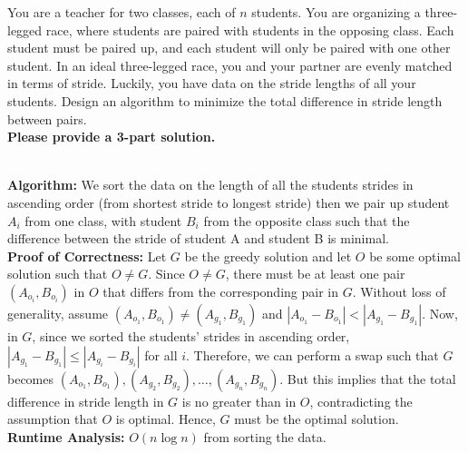 \documentclass[10.5pt]{article}
\begin{document}
You are a teacher for two classes, each of $n$ students. You are organizing a three-legged race, where students are paired with students in the opposing class. Each student must be paired up, and each student will only be paired with one other student. In an ideal three-legged race, you and your partner are evenly matched in terms of stride. Luckily, you have data on the stride lengths of all your students. Design an algorithm to minimize the total difference in stride length between pairs. \\
\newline
\textbf{Please provide a 3-part solution.}\\
\begin{solution}\\
    \textbf{Algorithm:} We sort the data on the length of all the students strides in 
    ascending order (from shortest stride to longest stride) then we pair up student $A_i$ from one class, with student $B_i$ 
    from the opposite class such that the difference between the stride of student A and student B is minimal.\\
    \textbf{Proof of Correctness:}
    Let $G$ be the greedy solution and let $O$ be some optimal solution such that $O \neq G$. Since $O \neq G$, there must be at least one pair $(A_{o_i}, B_{o_i})$ in $O$ that differs from the corresponding pair in $G$.
    Without loss of generality, assume $(A_{o_1}, B_{o_1}) \neq (A_{g_1}, B_{g_1})$ and $|A_{o_1} - B_{o_1}| < |A_{g_1} - B_{g_1}|$.
    Now, in $G$, since we sorted the students' strides in ascending order, $|A_{g_1} - B_{g_1}| \leq |A_{g_i} - B_{g_i}|$ for all $i$. Therefore, we can perform a swap such that $G$ becomes ${(A_{o_1}, B_{o_1}), (A_{g_2}, B_{g_2}), \dots, (A_{g_n}, B_{g_n})}$. But this implies that the total difference in stride length in $G$ is no greater than in $O$, contradicting the assumption that $O$ is optimal. Hence, $G$ must be the optimal solution.\\
    \textbf{Runtime Analysis:} $O(n\log n)$ from sorting the data. 
  \end{solution}
\end{document}
